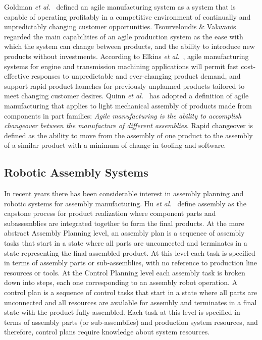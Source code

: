 Goldman \textit{et al.}~\cite{Goldman.1994} defined an agile manufacturing system as a system that is capable of operating profitably in a competitive environment of
continually and unpredictably changing customer opportunities. Tsourveloudis \& Valavanis~\cite{Tsourveloudis.2002} regarded the main capabilities of an
agile production system as the ease with which the system can change between products, and the ability to introduce new products without investments. According to Elkins \textit{et al.}~\cite{Elkins.2004}, agile manufacturing systems for engine and transmission
machining applications will permit fast cost-effective responses to unpredictable and ever-changing product demand, and support rapid product launches for previously unplanned products tailored to meet changing customer desires. Quinn \textit{et al.}~\cite{QUINN.1997} has adopted a definition of agile manufacturing that applies to light mechanical assembly of products made from components in part families: \emph{Agile manufacturing is the ability to accomplish changeover between the manufacture of different assemblies}. Rapid changeover is defined as the ability to move from the assembly of one product to the assembly of a similar product with a minimum of change in tooling and software.


\subsection{Robotic Assembly Systems}
In recent years there has been considerable interest in assembly planning and robotic systems for assembly manufacturing. Hu \textit{et al.}~\cite{Hu.2011} define assembly as the capstone process for product realization where component parts and subassemblies are integrated together to form the final products. At the more abstract Assembly Planning level, an assembly plan is a sequence of assembly tasks that start in a state where all parts are unconnected and terminates in a state representing the final assembled product. At this level each task is specified in terms of assembly parts or sub-assemblies, with no reference to production line resources or tools. At the Control Planning level each assembly task is broken down into steps, each one corresponding to an assembly robot operation. A control plan is a sequence of control tasks that start in a state where all parts are unconnected and all resources are available for assembly and terminates in a final state with the product fully assembled. Each task at this level is specified in terms of assembly parts (or sub-assemblies) and production system resources, and therefore, control plans require knowledge about system resources.


